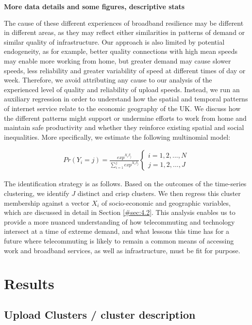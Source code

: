\documentclass[]{interact}
\theoremstyle{plain}%
\theoremstyle{definition}
\theoremstyle{remark}
\begin{document}
\textbf{More data details and some figures, descriptive stats}

The cause of these different experiences of broadband resilience may be
different in different areas, as they may reflect either similarities in
patterns of demand or similar quality of infrastructure. Our approach is
also limited by potential endogeneity, as for example, better quality
connections with high mean speeds may enable more working from home, but
greater demand may cause slower speeds, less reliability and greater
variability of speed at different times of day or week. Therefore, we
avoid attributing any cause to our analysis of the experienced level of
quality and reliability of upload speeds. Instead, we run an auxiliary
regression in order to understand how the spatial and temporal patterns
of internet service relate to the economic geography of the UK. We
discuss how the different patterns might support or undermine efforts to
work from home and maintain safe productivity and whether they reinforce
existing spatial and social inequalities. More specifically, we estimate
the following multinomial model:

\begin{align}
Pr(Y_{i}=j) = \frac{exp^{X_{i}\beta_{j}}}{\sum_{i=1}^j exp^{X_{i}\beta_{j}}}
\begin{cases}
    i = 1, 2, ... , N \\  
    j = 1, 2, ... , J
\end{cases}\label{eq1}
\end{align}

The identification strategy is as follows. Based on the outcomes of the
time-series clustering, we identify \(J\) distinct and crisp clusters.
We then regress this cluster membership against a vector \(X_{i}\) of
socio-economic and geographic variables, which are discussed in detail
in Section \ref{#sec:4.2}. This analysis enables us to provide a more
nuanced understanding of how telecommuting and technology intersect at a
time of extreme demand, and what lessons this time has for a future
where telecommuting is likely to remain a common means of accessing work
and broadband services, as well as infrastructure, must be fit for
purpose.

\hypertarget{sec:4}{%
\section{Results}\label{sec:4}}

\hypertarget{sec:4.1}{%
\subsection{Upload Clusters / cluster description}\label{sec:4.1}}
\end{document}
